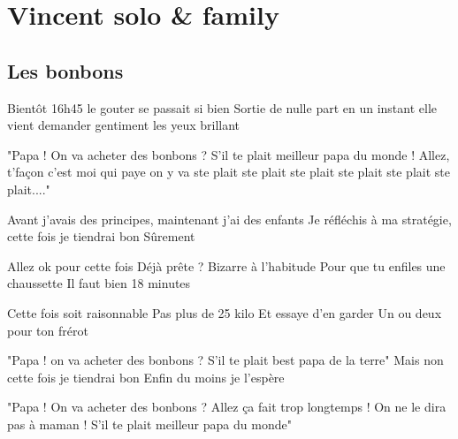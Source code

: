 \documentclass{article}
\newenvironment{album}[1]%
{%
  \section*{#1}
}%
{%
}
\newenvironment{song}[1]%
{%
  \subsection*{\textbf{#1}}
  \begin{multicols*}{2}
}%
{%
  \end{multicols*}
  \newpage
}
\newenvironment{couplet} %
{%
  \verbatim
}%
{% end code
  \endverbatim
}
\newenvironment{refrain} %
{%
  \verbatim
}%
{% end code
  \endverbatim
}
\begin{document}
\begin{album}{Vincent solo \& family}
\begin{song}{Les bonbons}
\begin{couplet}
Bientôt 16h45 le gouter se passait si bien
Sortie de nulle part en un instant elle vient demander gentiment
les yeux brillant
\end{couplet}
\begin{refrain}
"Papa ! On va acheter des bonbons ?
S'il te plait meilleur papa du monde !
Allez, t'façon c'est moi qui paye
on y va ste plait ste plait ste plait ste plait ste plait ste plait...."
\end{refrain}
\begin{couplet}
Avant j'avais des principes, maintenant j'ai des enfants
Je réfléchis à ma stratégie, cette fois je tiendrai bon
Sûrement
\end{couplet}
\begin{refrain}
Allez ok pour cette fois
Déjà prête ? Bizarre à l'habitude
Pour que tu enfiles une chaussette
Il faut bien 18 minutes 
\end{refrain}
\begin{couplet}
Cette fois soit raisonnable
Pas plus de 25 kilo
Et essaye d'en garder
Un ou deux pour ton frérot
\end{couplet}
\begin{refrain}
"Papa ! on va acheter des bonbons ?
S'il te plait best papa de la terre"
Mais non cette fois je tiendrai bon
Enfin du moins je l'espère
\end{refrain}
\begin{refrain}
"Papa ! On va acheter des bonbons ?
Allez ça fait trop longtemps !
On ne le dira pas à maman !
S'il te plait meilleur papa du monde"
\end{refrain}
\end{song}

\end{album}
\end{document}
